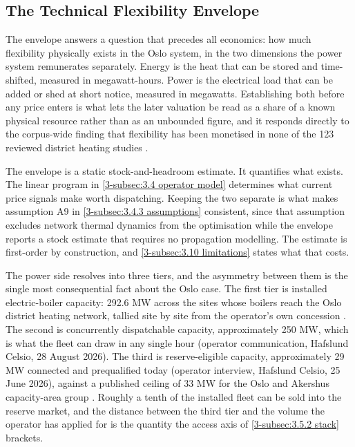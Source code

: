 \subsection{The Technical Flexibility Envelope}
\label{3-subsec:3.3 technical envelope}

The envelope answers a question that precedes all economics: how much flexibility physically exists in the Oslo system, in the two dimensions the power system remunerates separately. Energy is the heat that can be stored and time-shifted, measured in megawatt-hours. Power is the electrical load that can be added or shed at short notice, measured in megawatts. Establishing both before any price enters is what lets the later valuation be read as a share of a known physical resource rather than as an unbounded figure, and it responds directly to the corpus-wide finding that flexibility has been monetised in none of the 123 reviewed district heating studies \cite{ahmed_district_2025}.

The envelope is a static stock-and-headroom estimate. It quantifies what exists. The linear program in \autoref{3-subsec:3.4 operator model} determines what current price signals make worth dispatching. Keeping the two separate is what makes assumption A9 in \autoref{3-subsec:3.4.3 assumptions} consistent, since that assumption excludes network thermal dynamics from the optimisation while the envelope reports a stock estimate that requires no propagation modelling. The estimate is first-order by construction, and \autoref{3-subsec:3.10 limitations} states what that costs.

The power side resolves into three tiers, and the asymmetry between them is the single most consequential fact about the Oslo case. The first tier is installed electric-boiler capacity: 292.6 MW across the sites whose boilers reach the Oslo district heating network, tallied site by site from the operator's own concession \cite{nve_konsesjonssak_2026}. The second is concurrently dispatchable capacity, approximately 250 MW, which is what the fleet can draw in any single hour (operator communication, Hafslund Celsio, 28 August 2026). The third is reserve-eligible capacity, approximately 29 MW connected and prequalified today (operator interview, Hafslund Celsio, 25 June 2026), against a published ceiling of 33 MW for the Oslo and Akershus capacity-area group \cite{statnett_innforing_2026}. Roughly a tenth of the installed fleet can be sold into the reserve market, and the distance between the third tier and the volume the operator has applied for is the quantity the access axis of \autoref{3-subsec:3.5.2 stack} brackets.

